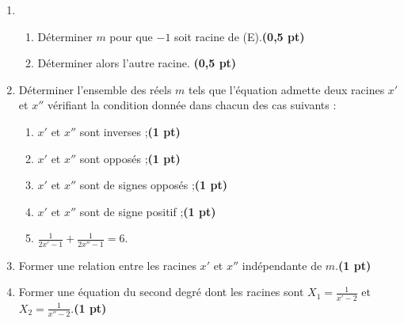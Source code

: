 \documentclass{article}
\begin{document}
\begin{enumerate}
    \item 
    \begin{enumerate}
        \item Déterminer \(m\) pour que \(-1\) soit racine de (E).\textbf{(0,5 pt)}
        
        \item Déterminer alors l’autre racine. \textbf{(0,5 pt)}
    \end{enumerate}

    \item Déterminer l’ensemble des réels \(m\) tels que l’équation admette deux racines \(x'\) et \(x''\) vérifiant la condition donnée dans chacun des cas suivants :
    \begin{enumerate}
        \item \(x'\) et \(x''\) sont inverses ;\textbf{(1 pt)}
        
        \item \(x'\) et \(x''\) sont opposés ;\textbf{(1 pt)}
        
        \item \(x'\) et \(x''\) sont de signes opposés ;\textbf{(1 pt)}
        
        \item \(x'\) et \(x''\) sont de signe positif ;\textbf{(1 pt)}
        
        \item \(\frac{1}{2x'-1} + \frac{1}{2x''-1} = 6\).
    \end{enumerate}

    \item Former une relation entre les racines \(x'\) et \(x''\) indépendante de \(m\).\textbf{(1 pt)}

    \item Former une équation du second degré dont les racines sont \(X_1 = \frac{1}{x' - 2}\) et \(X_2 = \frac{1}{x'' - 2}\).\textbf{(1 pt)}
\end{enumerate}

\end{document}
